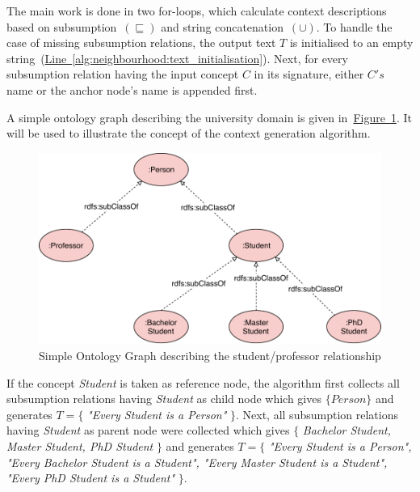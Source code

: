 The main work is done in two for-loops, which calculate context descriptions based on subsumption~$(\sqsubseteq)$ and string concatenation~$(\cup)$. To handle the case of missing subsumption relations, the output text $T$ is initialised to an empty string~(\hyperref[alg:neighbourhood:text_initialisation]{Line~\ref*{alg:neighbourhood:text_initialisation}}). Next, for every subsumption relation having the input concept $C$ in its signature, either $C's$ name or the anchor node's name is appended first.

A simple ontology graph describing the university domain is given in~\hyperref[fig:simple_owl_graph]{Figure~\ref*{fig:simple_owl_graph}}. It will
be used to illustrate the concept of the context generation algorithm.
\begin{figure}
	 \centering
	 \includegraphics[width=\textwidth]{drawio/University_Ontology_Example-Professor-Student}
	 \caption{Simple Ontology Graph describing the student/professor relationship}\label{fig:simple_owl_graph}
\end{figure}
If the concept \emph{Student} is taken as reference node, the algorithm first collects all subsumption relations having \emph{Student} as child node which gives $\{Person\}$ and generates $T=\{$ \emph{"Every Student is a Person"} $\}$. Next, all subsumption relations having \emph{Student} as parent node were collected which gives $\{$ \emph{Bachelor Student, Master Student, PhD Student} $\}$ and generates $T=\{$ \emph{"Every Student is a Person", "Every Bachelor Student is a Student", "Every Master Student is a Student", "Every PhD Student is a Student"} $\}$. 

